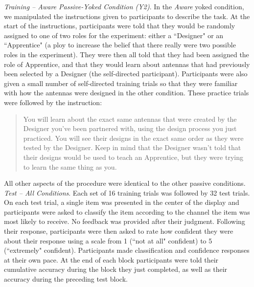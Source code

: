 \documentclass[3p,twocolumn,authoryear,10pt]{elsarticle}
\begin{document}
\noindent
\textit{Training -- Aware Passive-Yoked Condition (Y2)}. In the \textit{Aware} yoked condition, we manipulated the instructions given to participants to describe the task. At the start of the instructions, participants were told that they would be randomly assigned to one of two roles for the experiment: either a ``Designer" or an ``Apprentice" (a ploy to increase the belief that there really were two possible roles in the experiment). They were then all told that they had been assigned the role of Apprentice, and that they would learn about antennas that had previously been selected by a Designer (the self-directed participant). Participants were also given a small number of self-directed training trials so that they were familiar with how the antennas were designed in the other condition. These practice trials were followed by the instruction: 
\begin{quote}
You will learn about the exact same antennas that were created by the Designer you've been partnered with, using the design process you just practiced. You will see their designs in the exact same order as they were tested by the Designer. Keep in mind that the Designer wasn't told that their designs would be used to teach an Apprentice, but they were trying to learn the same thing as you.
\end{quote}
All other aspects of the procedure were identical to the other passive conditions.\\

\noindent
\textit{Test -- All Conditions}. Each set of 16 training trials was followed by 32 test trials. On each test trial, a single item was presented in the center of the display and participants were asked to classify the item according to the channel the item was most likely to receive. No feedback was provided after their judgment. Following their response, participants were then asked to rate how confident they were about their response using a scale from 1 (``not at all" confident) to 5 (``extremely" confident). Participants made classification and confidence responses at their own pace. At the end of each block participants were told their cumulative accuracy during the block they just completed, as well as their accuracy during the preceding test block.

\end{document}
